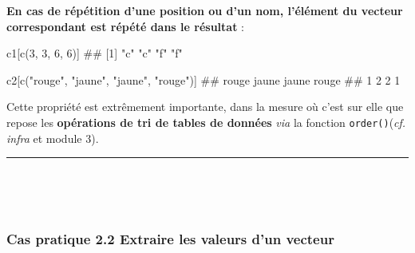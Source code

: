 \documentclass[12pt,twosided, notitlepage]{book}
\newenvironment{Shaded}{}{}
\newcommand{\KeywordTok}[1]{\textcolor[rgb]{0.00,0.00,1.00}{{#1}}}
\newcommand{\DecValTok}[1]{{#1}}
\newcommand{\StringTok}[1]{\textcolor[rgb]{0.00,0.50,0.50}{{#1}}}
\newcommand{\NormalTok}[1]{{#1}}
\renewenvironment{Shaded}{\begin{snugshade}}{\end{snugshade}}
\begin{document}
\textbf{En cas de répétition d'une position ou d'un nom, l'élément du
vecteur correspondant est répété dans le résultat} :

\begin{Shaded}
\begin{Highlighting}[]
\NormalTok{c1[}\KeywordTok{c}\NormalTok{(}\DecValTok{3}\NormalTok{, }\DecValTok{3}\NormalTok{, }\DecValTok{6}\NormalTok{, }\DecValTok{6}\NormalTok{)]}
  \NormalTok{## [1] "c" "c" "f" "f"}

\NormalTok{c2[}\KeywordTok{c}\NormalTok{(}\StringTok{"rouge"}\NormalTok{, }\StringTok{"jaune"}\NormalTok{, }\StringTok{"jaune"}\NormalTok{, }\StringTok{"rouge"}\NormalTok{)]}
  \NormalTok{## rouge jaune jaune rouge }
  \NormalTok{##     1     2     2     1}
\end{Highlighting}
\end{Shaded}

Cette propriété est extrêmement importante, dans la mesure où c'est sur
elle que repose les \textbf{opérations de tri de tables de données}
\emph{via} la fonction \texttt{order()}(\emph{cf.} \emph{infra} et
module 3).

\begin{center}\rule{0.5\linewidth}{\linethickness}\end{center}

~

~

\subsubsection{\texorpdfstring{\textbf{Cas pratique 2.2} Extraire les
valeurs d'un
vecteur}{Cas pratique 2.2 Extraire les valeurs d'un vecteur}}\label{cas-pratique-2.2-extraire-les-valeurs-dun-vecteur}

\end{document}
